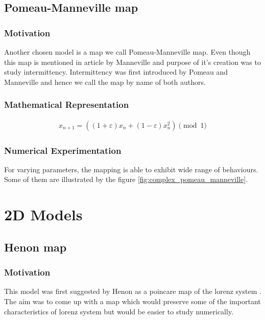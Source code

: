 \subsection{Pomeau-Manneville map}

\subsubsection{Motivation}
Another chosen model is a map we call Pomeau-Manneville map.
Even though this map is mentioned in article by Manneville \cite{Manneville1980} and purpose of it's creation was to study intermittency.
Intermittency was first introduced by Pomeau and Manneville \cite{Pomeau1980} and hence we call the map by name of both authors.

\subsubsection{Mathematical Representation}

\begin{align}
    x_{n+1} = ((1 + \varepsilon) x_{n} + (1 - \varepsilon) x_{n}^2) \pmod{1}
\end{align}

\subsubsection{Numerical Experimentation}
For varying parameters, the mapping is able to exhibit wide range of behaviours.
Some of them are illustrated by the figure \ref{fig:complex_pomeau_manneville}.

\section{2D Models}

\subsection{Henon map}

\subsubsection{Motivation}

This model was first suggested by Henon \cite{Henon1976} as a poincare map of the lorenz system \cite{Lorenz2004}.
The aim was to come up with a map which would preserve some of the important characteristics of lorenz system but would be easier to study numerically.

